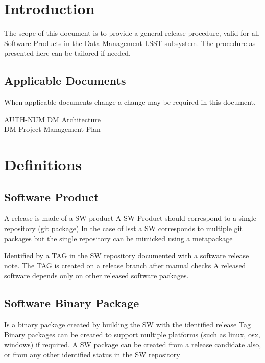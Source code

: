 \section{Introduction} \label{sec:intro}

The scope of this document is to provide a general release procedure, valid for all Software Products in the Data Management LSST subsystem. The procedure as presented here can be tailored if needed.

\subsection{Applicable Documents}

When applicable documents change a change may be required in this document.
\begin{tabbing}
AUTH-NUM\= \kill
{} \>     DM Architecture\\
 \>     DM Project Management Plan   \\
\end{tabbing}

\newpage
\section{Definitions} \label{sec:definitions}

\subsection{Software Product} \label{sect:swprod}
A release is made of a SW product
A SW Product should correspond to a single repository (git package)
In the case of lsst a SW corresponds to multiple git packages but the single repository can be mimicked using a metapackage 


 \label{sect:swrel}
Identified by  a TAG in the SW repository
 documented with a software release note.
The TAG is created on a release branch after manual checks
A released software depends only on other released software packages.


\subsection{Software Binary Package} \label{sect:swbpkg}
Is a binary package created by building the SW with the identified release Tag 
Binary packages can be created to support multiple platforms (such as linux, osx, windows) if required.
A SW package can be created from a release candidate also, or from any other identified status  in the SW repository


